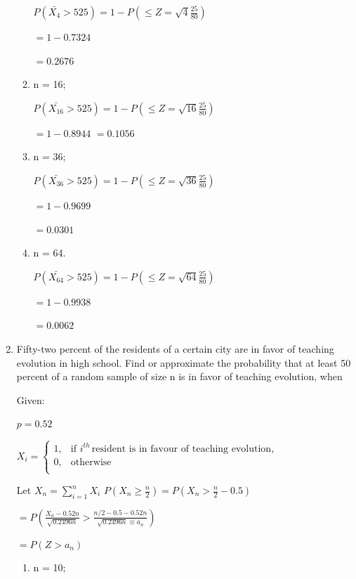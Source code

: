 \documentclass{article}
\begin{document}
\begin{enumerate}
\begin{enumerate}
         $\displaystyle P(\bar{X_4} > 525) = 1 - P\left(\leq Z = \sqrt{4}\frac{25}{80}\right)$
         
         $= 1 - 0.7324$

         $= 0.2676$

        \item n = 16;

        $\displaystyle P(\bar{X_16} > 525) = 1 - P\left(\leq Z = \sqrt{16}\frac{25}{80}\right)$
        
        $= 1 - 0.8944$
        $= 0.1056$

        \item n = 36;

        $\displaystyle P(\bar{X_36} > 525) = 1 - P\left(\leq Z = \sqrt{36}\frac{25}{80}\right)$
        
        $= 1 - 0.9699$
        
        $= 0.0301$

        \item n = 64.

        $\displaystyle P(\bar{X_64} > 525) = 1 - P\left(\leq Z = \sqrt{64}\frac{25}{80}\right)$
        
        $= 1 - 0.9938$
        
        $= 0.0062$
    \end{enumerate}
    \item Fifty-two percent of the residents of a certain city are in favor of teaching evolution in high school. Find or approximate the probability that at least 50 percent of a random sample of size n is in favor of teaching evolution, when
    
    Given:

    $p = 0.52$

    $X_i = 
    \begin{cases}
    1, & \text{if } i^{th} \, \text{resident is in favour of teaching evolution},\\
    0, & \text{otherwise}\\
    \end{cases}$

    Let $X_n = \displaystyle \sum_{i=1}^n{X_i}$
    $P\left(X_n \geq \frac{n}{2}\right) = P\left(X_n > \frac{n}{2} - 0.5\right)$

    $= P\left(\frac{X_n - 0.52n}{\sqrt{0.2496n}} > \frac{n/2 - 0.5 - 0.52n}{\sqrt{0.2496n} \equiv a_n}\right)$

    $= P(Z > a_n)$

    \begin{enumerate}
        \item n = 10;
        

\end{enumerate}
\end{enumerate}
\end{document}
